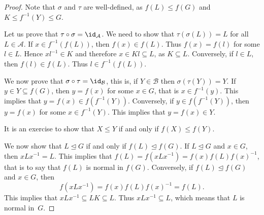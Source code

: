 \begin{proof}
    Note that $\sigma$ and $\tau$ are well-defined, as 
    $f(L)\leq f(G)$ and $K\leq f^{-1}(Y)\leq G$.

    Let us prove that $\tau\circ\sigma=\id_\mathcal{A}$. We need to show that $\tau(\sigma(L))=L$ for all $L\in\mathcal{A}$. If $x\in f^{-1}(f(L))$, then $f(x)\in f(L)$. Thus $f(x)=f(l)$ for some
    $l\in L$. Hence $xl^{-1}\in K$ and therefore 
    $x\in Kl\subseteq L$, as $K\subseteq L$.
    Conversely, if $l\in L$, then $f(l)\in f(L)$. Thus $l\in f^{-1}(f(L))$.

    We now prove that $\sigma\circ\tau=\id_\mathcal{B}$, this is, if  $Y\in\mathcal{B}$ then $\sigma(\tau(Y))=Y$. If $y\in Y\subseteq f(G)$, then $y=f(x)$ for some $x\in G$, that is $x\in f^{-1}(y)$. This implies that $y=f(x)\in f(f^{-1}(Y))$. Conversely, if $y\in f(f^{-1}(Y))$, then $y=f(x)$ for some $x\in f^{-1}(Y)$. This implies that $y=f(x)\in Y$.

    It is an exercise to show that 
    $X\leq Y$ if and only if $f(X)\leq f(Y)$.

    We now show that $L\unlhd G$ if and only if 
    $f(L)\unlhd f(G)$. If $L\unlhd G$ and $x\in G$,
    then $xLx^{-1}=L$. This implies that $f(L)=f(xLx^{-1})=f(x)f(L)f(x)^{-1}$, that is
    to say that $f(L)$ is normal in $f(G)$. Conversely, if
    $f(L)\unlhd f(G)$ and $x\in G$, then 
        \[
        f(xLx^{-1})=f(x)f(L)f(x)^{-1}=f(L).
        \]
    This implies that $xLx^{-1}\subseteq LK\subseteq L$. Thus 
    $xLx^{-1}\subseteq L$, which means that $L$ is normal in~$G$. 
\end{proof}



